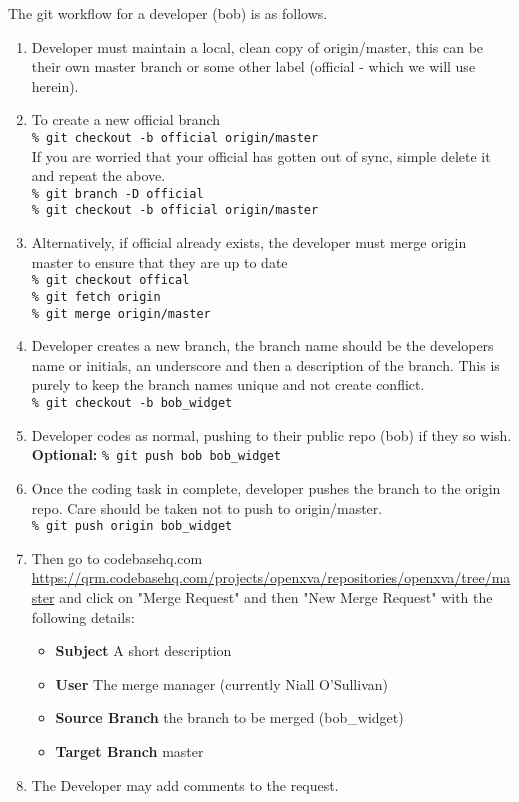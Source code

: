 \documentclass[12pt, a4paper]{article}
\begin{document}
The git workflow for a developer (bob) is as follows.
\begin{enumerate}
\item Developer must maintain a local, clean copy of origin/master, this can be their own master branch or some other label (official - which we will use herein).
\item To create a new official branch \\
 \texttt{\% git checkout -b official origin/master} \\
 If you are worried that your official has gotten out of sync, simple delete it and repeat the above.\\
 \texttt{\% git branch -D official} \\
 \texttt{\% git checkout -b official origin/master}
\item Alternatively, if official already exists, the developer must merge origin master to ensure that they are up to date\\
 \texttt{\% git checkout offical} \\
 \texttt{\% git fetch origin} \\
 \texttt{\% git merge origin/master} \\
\item Developer creates a new branch, the branch name should be the developers name or initials, an underscore and then a description of the branch. This is purely to keep the branch names unique and not create conflict.\\
 \texttt{\% git checkout -b bob\_widget}
\item Developer codes as normal, pushing to their public repo (bob) if they so wish.\\
\textbf{Optional:} \texttt{\% git push bob bob\_widget}
\item Once the coding task in complete, developer pushes the branch to the origin repo. Care should be taken not to push to origin/master.\\
 \texttt{\% git push origin bob\_widget}
 \item Then go to codebasehq.com \url{https://qrm.codebasehq.com/projects/openxva/repositories/openxva/tree/master} and click on "Merge Request" and then "New Merge Request" with the following details:
 \begin{itemize}
 \item \textbf{Subject} A short description
 \item \textbf{User} The merge manager (currently Niall O'Sullivan)
 \item \textbf{Source Branch} the branch to be merged (bob\_widget)
 \item \textbf{Target Branch} master
 \end{itemize}
\item The Developer may add comments to the request.
\end{enumerate}
\end{document}
